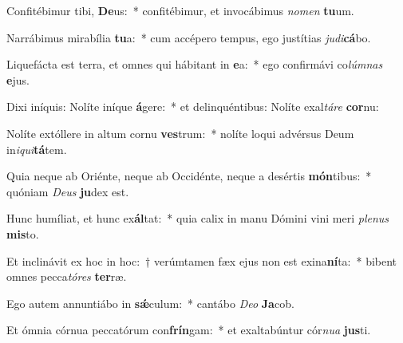 \item Confitébimur tibi, \textbf{De}us:~* confitébimur, et invocábimus \textit{no}\textit{men} \textbf{tu}um.
\item Narrábimus mirabília \textbf{tu}a:~* cum accépero tempus, ego justítias \textit{ju}\textit{di}\textbf{cá}bo.
\item Liquefácta est terra, et omnes qui hábitant in \textbf{e}a:~* ego confirmávi co\textit{lúm}\textit{nas} \textbf{e}jus.
\item Dixi iníquis: Nolíte iníque \textbf{á}gere:~* et delinquéntibus: Nolíte exal\textit{tá}\textit{re} \textbf{cor}nu:
\item Nolíte extóllere in altum cornu \textbf{ves}trum:~* nolíte loqui advérsus Deum in\textit{i}\textit{qui}\textbf{tá}tem.
\item Quia neque ab Oriénte, neque ab Occidénte, neque a desértis \textbf{món}tibus:~* quóniam \textit{De}\textit{us} \textbf{ju}dex est.
\item Hunc humíliat, et hunc ex\textbf{ál}tat:~* quia calix in manu Dómini vini meri \textit{ple}\textit{nus} \textbf{mis}to.
\item Et inclinávit ex hoc in hoc:~† verúmtamen fæx ejus non est exina\textbf{ní}ta:~* bibent omnes pecca\textit{tó}\textit{res} \textbf{ter}ræ.
\item Ego autem annuntiábo in \textbf{sǽ}culum:~* cantábo \textit{De}\textit{o} \textbf{Ja}cob.
\item Et ómnia córnua peccatórum con\textbf{frín}gam:~* et exaltabúntur cór\textit{nu}\textit{a} \textbf{jus}ti.

